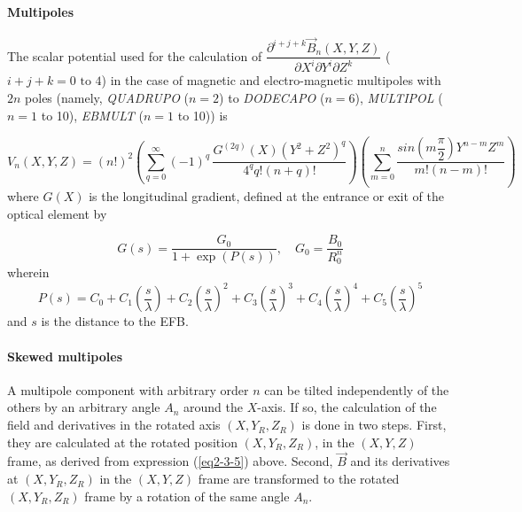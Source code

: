 \paragraph{Multipoles}

\noindent The scalar potential used for the calculation of 
$ \dfrac{\partial^{i+j+k} \vec B_{n}(X,Y,Z)}{ \partial X^i\partial Y^i\partial 
Z^k}$ ($i+j+k= 0 \text{ to } 4$) in the case of 
 magnetic and electro-magnetic multipoles with $2n$ poles
(namely, \textsl{QUADRUPO} ($n = 2$) to  
\textsl{DODECAPO} ($n=6$),   
\textsl{MULTIPOL} ($n = 1$ to 10), 
\textsl{EBMULT} ($n=1$ to 10))   is~\cite{Biblio5}              %

\begin{equation}
	V_n(X,Y,Z)=(n!)^2 
	  \left( \sum^{ \infty}_{ q=0}(-1)^q \,
	        \dfrac{G^{(2q)}(X)(Y^2+Z^2)^q }{ 4^q q!(n+q)!} \right) 
	  \left( \sum^ n_{m=0}\dfrac{sin \left(m \dfrac{\pi }{ 2} \right) Y^{n-m} Z^m }{ m!(n-m)!} \right) 
	\label{eq2-3-5}
\end{equation}
%
 where $ G(X) $ is the longitudinal gradient, defined at the entrance 
 or exit of the optical element by

 \begin{equation}
	 G(s) = \dfrac{G_0 }{ 1+ \exp(P(s))} , \quad G_0 = \dfrac{B_0 }{R^n_0} 
 	\label{eq2-3-6}
 \end{equation}
wherein 
$$ P(s) = C_0
	       +C_1 \left(  \dfrac{s }{ \lambda} \right) 
	       +C_2 \left( \dfrac{s }{ \lambda} \right)^2 
	       + C_3 \left( \dfrac{s }{ \lambda} \right)^3 
	       +C_4 \left( \dfrac{s }{ \lambda} \right)^4 
	       + C_5 \left(\dfrac{s }{ \lambda} \right)^5 $$ 
and $s$ is the distance to the EFB.
 
\paragraph{Skewed multipoles}

\noindent A multipole component with arbitrary order $n$ can be tilted independently of 
the others by an arbitrary 
angle $A_n$ around the $X$-axis. If so, the calculation of the field and derivatives in the 
rotated axis $ (X,Y_R,Z_R) $ is done in two steps. First, they are 
calculated at the rotated position $ (X,Y_R,Z_R)$,  in the $ (X,Y,Z) $ 
frame, as derived from  expression (\ref{eq2-3-5}) above. Second, $ \vec  B $ and 
its derivatives at $ (X,Y_R,Z_R) $ in the $ (X,Y,Z) $ frame are transformed 
to the rotated $ (X,Y_R,Z_R) $ frame by a rotation of the same angle 
$A_n$. 

